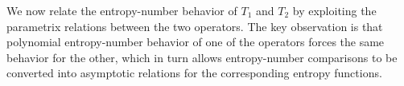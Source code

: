 \documentclass[a4paper,12pt]{article}
\let\originalleft\left
\let\originalright\right
\renewcommand{\left}{\mathopen{}\mathclose\bgroup\originalleft}
\renewcommand{\right}{\aftergroup\egroup\originalright}
\newcommand{\R}{\mathbb{R}}
\begin{document}




\color{orange}
We now relate the entropy-number behavior of $T_1$ and $T_2$ by exploiting the
parametrix relations between the two operators.
The key observation is that polynomial entropy-number behavior of one of the
operators forces the same behavior for the other, which in turn allows
entropy-number comparisons to be converted into asymptotic relations for the
corresponding entropy functions.
\end{document}
